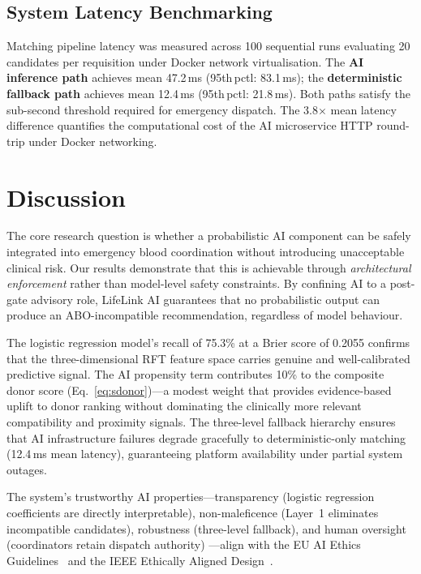 \documentclass[conference]{IEEEtran}
\begin{document}
\subsection{System Latency Benchmarking}
Matching pipeline latency was measured across 100 sequential runs
evaluating 20 candidates per requisition under Docker network
virtualisation. The \textbf{AI inference path} achieves mean
47.2\,ms (95th\,pctl: 83.1\,ms); the \textbf{deterministic fallback
path} achieves mean 12.4\,ms (95th\,pctl: 21.8\,ms). Both paths
satisfy the sub-second threshold required for emergency dispatch.
The 3.8$\times$ mean latency difference quantifies the computational
cost of the AI microservice HTTP round-trip under Docker networking.

\section{Discussion}

The core research question is whether a probabilistic AI component can
be safely integrated into emergency blood coordination without
introducing unacceptable clinical risk. Our results demonstrate that
this is achievable through \emph{architectural enforcement} rather
than model-level safety constraints. By confining AI to a post-gate
advisory role, LifeLink AI guarantees that no probabilistic output can
produce an ABO-incompatible recommendation, regardless of model
behaviour.

The logistic regression model's recall of 75.3\% at a Brier score of
0.2055 confirms that the three-dimensional RFT feature space carries
genuine and well-calibrated predictive signal. The AI propensity term
contributes 10\% to the composite donor score (Eq.~\ref{eq:sdonor})---a
modest weight that provides evidence-based uplift to donor ranking
without dominating the clinically more relevant compatibility and
proximity signals. The three-level fallback hierarchy ensures that AI
infrastructure failures degrade gracefully to deterministic-only
matching (12.4\,ms mean latency), guaranteeing platform availability
under partial system outages.

The system's trustworthy AI properties---transparency (logistic
regression coefficients are directly interpretable), non-maleficence
(Layer~1 eliminates incompatible candidates), robustness (three-level
fallback), and human oversight (coordinators retain dispatch authority)
---align with the EU AI Ethics Guidelines~\cite{eu_hleg2019} and the
IEEE Ethically Aligned Design~\cite{ieee_ead2019}.
\end{document}
